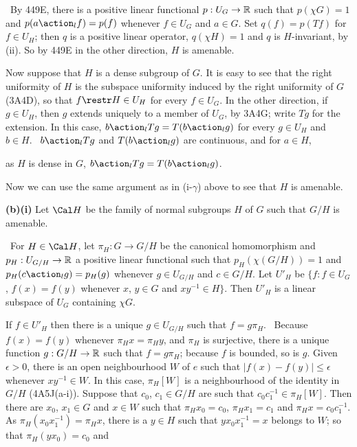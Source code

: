 {\qquad\grheadc\ By 449E, there is a positive linear functional
$p:U_G\to\Bbb R$
such that $p(\chi G)=1$ and $p(a\action_lf)=p(f)$ whenever $f\in U_G$
and $a\in G$.   Set $q(f)=p(Tf)$ for $f\in U_H$;  then $q$ is a positive
linear operator, $q(\chi H)=1$ and $q$ is $H$-invariant, by (ii).   So
by 449E in the other direction, $H$ is amenable.

\medskip

 Now suppose that $H$ is a dense subgroup of $G$.
It is easy to see that the right
uniformity of $H$ is the subspace uniformity induced by the right
uniformity of $G$ (3A4D), so that $f\restr H\in U_H$ for every $f\in U_G$.
In the other direction, if $g\in U_H$,
then $g$ extends uniquely to a member
of $U_G$, by 3A4G;  write $Tg$ for the extension.   In this case,
$b\action_lTg=T(b\action_lg)$ for every $g\in U_H$ and $b\in H$.   \Prf\
$b\action_lTg$ and $T(b\action_lg)$ are continuous, and for $a\in H$,


\noindent as $H$ is dense in $G$, $b\action_lTg=T(b\action_lg)$.\ \Qed

Now we can use the same argument as in (i-$\gamma$) above to see that $H$
is amenable.


{\bf (b)(i)} Let $\Cal H$ be the family of normal subgroups $H$ of $G$ such
that $G/H$ is amenable.

\medskip

\qquad\grheada\ For $H\in\Cal H$,
let $\pi_H:G\to G/H$ be the canonical homomorphism and
$p_H:U_{G/H}\to\Bbb R$ a
positive linear functional such that $p_H(\chi(G/H))=1$ and
$p_H(c\action_lg)=p_H(g)$ whenever $g\in U_{G/H}$ and $c\in G/H$.
Let $U'_H$ be
$\{f:f\in U_G$, $f(x)=f(y)$ whenever $x$, $y\in G$ and $xy^{-1}\in H\}$.
Then $U'_H$ is a linear subspace of $U_G$ containing $\chi G$.

If $f\in U'_H$
then there is a unique $g\in U_{G/H}$ such that $f=g\pi_H$.   \Prf\
Because $f(x)=f(y)$ whenever $\pi_Hx=\pi_Hy$, and $\pi_H$ is surjective,
there is a unique function $g:G/H\to\Bbb R$ such that $f=g\pi_H$;  because
$f$ is bounded, so is $g$.   Given $\epsilon>0$, there is an open
neighbourhood
$W$ of $e$ such that $|f(x)-f(y)|\le\epsilon$ whenever $xy^{-1}\in W$.
In this case, $\pi_H[W]$ is a neighbourhood of the identity in $G/H$
(4A5J(a-i)).   Suppose that $c_0$, $c_1\in G/H$ are such that
$c_0c_1^{-1}\in\pi_H[W]$.   Then there are $x_0$, $x_1\in G$ and $x\in W$
such that $\pi_Hx_0=c_0$, $\pi_Hx_1=c_1$ and $\pi_Hx=c_0c_1^{-1}$.
As $\pi_H(x_0x_1^{-1})=\pi_Hx$, there is a $y\in H$ such that
$yx_0x_1^{-1}=x$ belongs to $W$;  so that $\pi_H(yx_0)=c_0$ and

}
